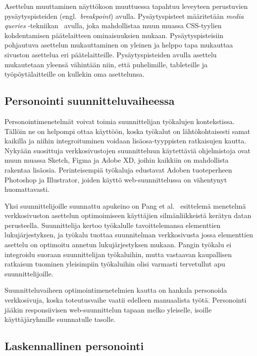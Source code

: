 \documentclass[finnish, 12pt, a4paper, elec, utf8, a-1b, online]{aaltothesis}
\begin{document}
Asettelun muuttaminen näyttökoon muuttuessa tapahtuu leveyteen perustuvien
pysäytyspisteiden (engl.\ \textit{breakpoint}) avulla. Pysäytyspisteet
määritetään \textit{media queries} -tekniikan~\cite{Rivoal:12:MQ} avulla, joka
mahdollistaa muun muassa CSS-tyylien kohdentamisen päätelaitteen ominaisuuksien
mukaan. Pysäytyspisteisiin pohjautuva asettelun mukauttaminen on yleinen ja
helppo tapa mukauttaa sivuston asettelua eri päätelaitteille. Pysäytyspisteiden
avulla asettelu mukautetaan yleensä vähintään niin, että puhelimille,
tableteille ja työpöytälaitteille on kullekin oma asettelunsa.

\subsection{Personointi suunnitteluvaiheessa}

Personointimenetelmät voivat toimia suunnittelijan työkalujen kontekstissa.
Tällöin ne on helpompi ottaa käyttöön, koska työkalut on lähtökohtaisesti samat
kaikilla ja niihin integroituminen voidaan lisäosa-tyyppisten ratkaisujen
kautta. Nykyään suosittuja verkkosivustojen suunnitteluun käytettäviä
ohjelmistoja ovat muun muassa Sketch, Figma ja Adobe XD, joihin kaikkiin on
mahdollista rakentaa lisäosia. Perinteisempiä työkaluja edustavat Adoben
tuoteperheen Photoshop ja Illustrator, joiden käyttö web-suunnittelussa on
vähentynyt huomattavasti.

Yksi suunnittelijoille suunnattu apukeino on Pang et al.~\cite{Pang2016}
esittelemä menetelmä verkkosivuston asettelun optimoimiseen käyttäjien
silmänliikkeistä kerätyn datan perusteella. Suunnittelija kertoo työkalulle
tavoittelemansa elementtien lukujärjestyksen, ja työkalu tuottaa suunnitelman
verkkosivusta jossa elementtien asettelu on optimoitu annetun lukujärjestyksen
mukaan. Pangin työkalu ei integroidu suoraan suunnittelijan työkaluihin, mutta
vastaavan kaupallisen ratkaisun tuominen yleisimpiin työkaluihin olisi varmasti
tervetullut apu suunnittelijoille.

Suunnitteluvaiheen optimointimenetelmien kautta on hankala personoida
verkkosivuja, koska toteutusvaihe vaatii edelleen manuaalista työtä. Personointi
jääkin responsiivisen web-suunnittelun tapaan melko yleiselle, isoille
käyttäjäryhmille suunnatulle tasolle.

\subsection{Laskennallinen personointi}
\end{document}
